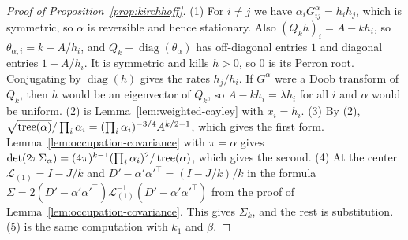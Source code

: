 \begin{proof}[Proof of Proposition~\ref{prop:kirchhoff}]
(1) For $i\ne j$ we have $\alpha_iG^\alpha_{ij}=h_ih_j$, which is symmetric, so
$\alpha$ is reversible and hence stationary. Also $(Q_kh)_i=A-kh_i$, so
$\theta_{\alpha,i}=k-A/h_i$, and $Q_k+\operatorname{diag}(\theta_\alpha)$ has
off-diagonal entries $1$ and diagonal entries $1-A/h_i$. It is symmetric and
kills $h>0$, so $0$ is its Perron root. Conjugating by $\operatorname{diag}(h)$
gives the rates $h_j/h_i$. If $G^\alpha$ were a Doob transform of $Q_k$, then $h$
would be an eigenvector of $Q_k$, so $A-kh_i=\lambda h_i$ for all $i$ and $\alpha$
would be uniform.
(2) is Lemma~\ref{lem:weighted-cayley} with $x_i=h_i$.
(3) By (2), $\sqrt{\operatorname{tree}(\alpha)}/\prod_i\alpha_i=(\prod_i\alpha_i)^{-3/4}A^{k/2-1}$,
which gives the first form. Lemma~\ref{lem:occupation-covariance} with $\pi=\alpha$
gives $\det(2\pi\Sigma_\alpha)=(4\pi)^{k-1}(\prod_i\alpha_i)^2/\operatorname{tree}(\alpha)$, which
gives the second.
(4) At the center $\mathcal L_{(1)}=I-J/k$ and $D'-\alpha'\alpha'^\top=(I-J/k)/k$
in the formula $\Sigma=2(D'-\alpha'\alpha'^\top)\mathcal L_{(1)}^{-1}
(D'-\alpha'\alpha'^\top)$ from the proof of
Lemma~\ref{lem:occupation-covariance}. This gives $\Sigma_k$, and the rest is
substitution.
(5) is the same computation with $k_1$ and $\beta$.
\end{proof}

